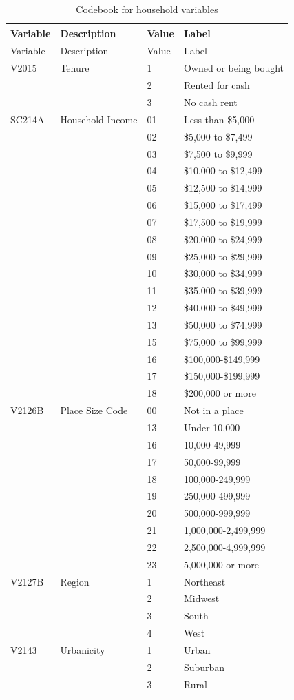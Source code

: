 \documentclass[
]{krantz}
\begin{document}
\begin{longtable}[]{@{}llll@{}}
\caption{\label{tab:cb-hh} Codebook for household variables}\tabularnewline
\toprule\noalign{}
Variable & Description & Value & Label \\
\midrule\noalign{}
\endfirsthead
\toprule\noalign{}
Variable & Description & Value & Label \\
\midrule\noalign{}
\endhead
\bottomrule\noalign{}
\endlastfoot
V2015 & Tenure & 1 & Owned or being bought \\
& & 2 & Rented for cash \\
& & 3 & No cash rent \\
SC214A & Household Income & 01 & Less than \$5,000 \\
& & 02 & \$5,000 to \$7,499 \\
& & 03 & \$7,500 to \$9,999 \\
& & 04 & \$10,000 to \$12,499 \\
& & 05 & \$12,500 to \$14,999 \\
& & 06 & \$15,000 to \$17,499 \\
& & 07 & \$17,500 to \$19,999 \\
& & 08 & \$20,000 to \$24,999 \\
& & 09 & \$25,000 to \$29,999 \\
& & 10 & \$30,000 to \$34,999 \\
& & 11 & \$35,000 to \$39,999 \\
& & 12 & \$40,000 to \$49,999 \\
& & 13 & \$50,000 to \$74,999 \\
& & 15 & \$75,000 to \$99,999 \\
& & 16 & \$100,000-\$149,999 \\
& & 17 & \$150,000-\$199,999 \\
& & 18 & \$200,000 or more \\
V2126B & Place Size Code & 00 & Not in a place \\
& & 13 & Under 10,000 \\
& & 16 & 10,000-49,999 \\
& & 17 & 50,000-99,999 \\
& & 18 & 100,000-249,999 \\
& & 19 & 250,000-499,999 \\
& & 20 & 500,000-999,999 \\
& & 21 & 1,000,000-2,499,999 \\
& & 22 & 2,500,000-4,999,999 \\
& & 23 & 5,000,000 or more \\
V2127B & Region & 1 & Northeast \\
& & 2 & Midwest \\
& & 3 & South \\
& & 4 & West \\
V2143 & Urbanicity & 1 & Urban \\
& & 2 & Suburban \\
& & 3 & Rural \\
\end{longtable}
\end{document}
